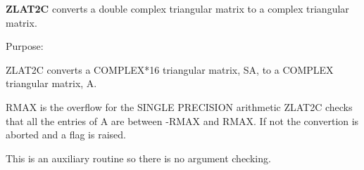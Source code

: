 {\bfseries Z\+L\+A\+T2\+C} converts a double complex triangular matrix to a complex triangular matrix. 

 \begin{DoxyParagraph}{Purpose\+: }
\begin{DoxyVerb} ZLAT2C converts a COMPLEX*16 triangular matrix, SA, to a COMPLEX
 triangular matrix, A.

 RMAX is the overflow for the SINGLE PRECISION arithmetic
 ZLAT2C checks that all the entries of A are between -RMAX and
 RMAX. If not the convertion is aborted and a flag is raised.

 This is an auxiliary routine so there is no argument checking.\end{DoxyVerb}
 
\end{DoxyParagraph}

